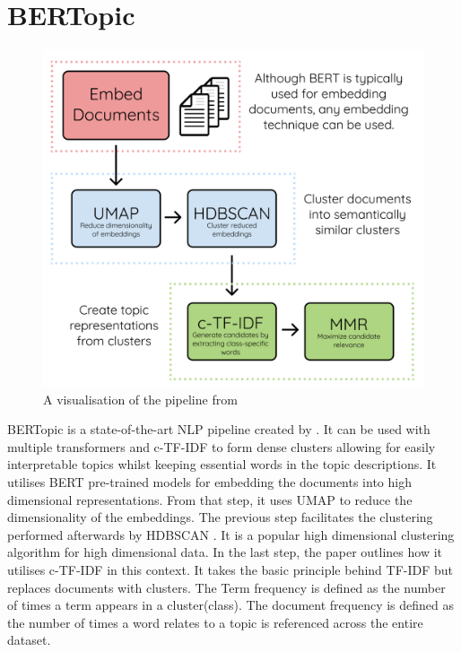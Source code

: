 \documentclass[12pt,MSc,a4paper,oneside]{muthesis}
\begin{document}
\section{BERTopic}

\begin{figure}[h]
  \centering
  \includegraphics[scale=0.3]{images/abstract/BERTopic pipeline.png}
  \caption{A visualisation of the pipeline from \cite{grootendorst2020bertopic}}
\end{figure}

BERTopic is a state-of-the-art NLP pipeline created by \cite{grootendorst2020bertopic}. It can be used with multiple transformers and c-TF-IDF to form dense clusters allowing for easily interpretable topics whilst keeping essential words in the topic descriptions. It utilises BERT pre-trained models for embedding the documents into high dimensional representations. From that step, it uses UMAP \cite{umap} to reduce the dimensionality of the embeddings. The previous step facilitates the clustering performed afterwards by HDBSCAN \cite{hdbscan}. It is a popular high dimensional clustering algorithm for high dimensional data. In the last step, the paper outlines how it utilises c-TF-IDF in this context. It takes the basic principle behind TF-IDF but replaces documents with clusters. The Term frequency is defined as the number of times a term appears in a cluster(class). The document frequency is defined as the number of times a word relates to a topic is referenced across the entire dataset.
\end{document}
